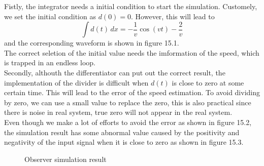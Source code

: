 \documentclass{article}
\begin{document}
Fistly, the integrator needs a initial condition to start the simulation.
Customely, we set the initial condition as $d(0)=0$.
However, this will lead to
\begin{equation*}
    \int d(t) \,dx = -\frac{1}{v}\cos(vt) - \frac{2}{v}
\end{equation*}
and the corresponding waveform is shown in figure 15.1.\\

The correct seletion of the initial value needs the imformation of the speed,
which is trapped in an endless loop.\\

Secondly, althouth the differentiator can put out the correct result,
the implementation of the divider is difficult when $d(t)$ is close to zero at some certain time.
This will lead to the error of the speed estimation.
To avoid dividing by zero, we can use a small value to replace the zero,
this is also practical since there is noise in real system,
true zero will not appear in the real system.\\

Even though we make a lot of efforts to avoid the error as shown in figure 15.2,
the simulation result has some abnormal value caused by the positivity and negativity of the input signal
when it is close to zero as shown in figure 15.3.\\

\begin{figure}[htbp]
    \centering
    \caption{Observer simulation result}
\end{figure}
\end{document}

